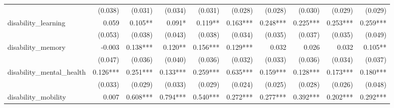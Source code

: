 \begin{tabular}{lrrrrrrrrr}
                             &                        (0.038) &                     (0.031) &                         (0.034) &                          (0.031) &                     (0.028) &                     (0.028) &                         (0.030) &                          (0.029) &                    (0.029) \\ 
disability_learning          &                          0.059 &                     0.105** &                          0.091* &                          0.119** &                    0.163*** &                    0.248*** &                        0.225*** &                         0.253*** &                   0.259*** \\ 
                             &                        (0.053) &                     (0.038) &                         (0.043) &                          (0.038) &                     (0.034) &                     (0.035) &                         (0.037) &                          (0.035) &                    (0.049) \\ 
disability_memory            &                         -0.003 &                    0.138*** &                         0.120** &                         0.156*** &                    0.129*** &                       0.032 &                           0.026 &                            0.032 &                    0.105** \\ 
                             &                        (0.047) &                     (0.036) &                         (0.040) &                          (0.036) &                     (0.032) &                     (0.033) &                         (0.036) &                          (0.034) &                    (0.037) \\ 
disability_mental_health     &                       0.126*** &                    0.251*** &                        0.133*** &                         0.259*** &                    0.635*** &                    0.159*** &                        0.128*** &                         0.173*** &                   0.180*** \\ 
                             &                        (0.033) &                     (0.029) &                         (0.033) &                          (0.029) &                     (0.024) &                     (0.025) &                         (0.028) &                          (0.026) &                    (0.048) \\ 
disability_mobility          &                          0.007 &                    0.608*** &                        0.794*** &                         0.540*** &                    0.272*** &                    0.277*** &                        0.392*** &                         0.202*** &                   0.292*** \\ 

\end{tabular}
